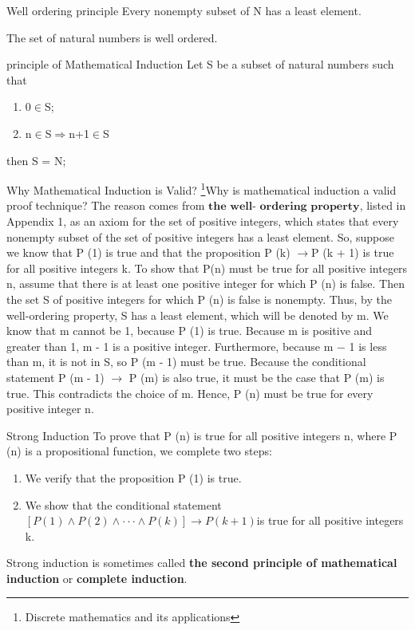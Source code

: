 \documentclass[cn,10pt,math=newtx,citestyle=gb7714-2015,bibstyle=gb7714-2015]{elegantbook}
\begin{document}
\begin{theorem}{Well ordering principle}
    Every nonempty subset of N has a least element.
\end{theorem}
\begin{note}
    The set of natural numbers is well ordered.
\end{note}

\begin{theorem}{principle of Mathematical Induction}
Let S be a subset of natural numbers such that
\begin{enumerate}
    \item 0$\in$S;
    \item n$\in$S$\Rightarrow$n+1$\in$S
    
\end{enumerate}
    then S = N;
\end{theorem}
\begin{remark}
    Why Mathematical Induction is Valid?
    \footnote{Discrete mathematics and its applications}Why is mathematical induction a valid proof technique? The reason comes from $\textbf{the well- ordering property}$, listed in Appendix 1, as an axiom for the set of positive integers, which states that every nonempty subset of the set of positive integers has a least element. So, suppose we know that P (1) is true and that the proposition P (k) $\to$P (k + 1) is true for all positive integers k. To show that P(n) must be true for all positive integers n, assume that there is at least one positive integer for which P (n) is false. Then the set S of positive integers for which P (n) is false is nonempty. Thus, by the well-ordering property, S has a least element, which will be denoted by m. We know that m cannot be 1, because P (1) is true. Because m is positive and greater than 1, m - 1 is a positive integer. Furthermore, because m − 1 is less than m, it is not in S, so P (m - 1) must be true. Because the conditional statement P (m - 1) $\to$ P (m) is also true, it must be the case that P (m) is true. This contradicts the choice of m. Hence, P (n) must be true for every positive integer n.
\end{remark}

\begin{theorem}{Strong Induction}
    To prove that P (n) is true for all positive integers n, where P (n) is a propositional function, we complete two steps:
    \begin{enumerate}
        \item We verify that the proposition P (1) is true.
        \item We show that the conditional statement $[ P ( 1)  \land  P ( 2) \land  \cdotp  \cdotp  \cdotp  \land P ( k)]  \rightarrow  P ( k + 1)  $is true for all positive integers k.
    \end{enumerate}
\end{theorem}
\begin{note}
    Strong induction is sometimes called \textbf{the second principle of mathematical induction} or \textbf{complete induction}. 
\end{note}
\end{document}
